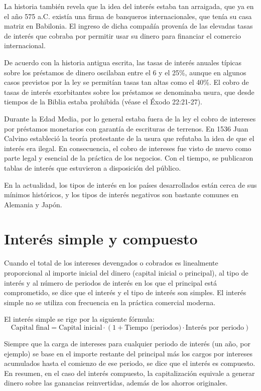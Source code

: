 \documentclass[
]{krantz}
\begin{document}
La historia también revela que la idea del interés estaba tan arraigada, que ya en el año 575 a.C. existía una firma de banqueros internacionales, que tenía su casa matriz en Babilonia. El ingreso de dicha compañía provenía de las elevadas tasas de interés que cobraba por permitir usar su dinero para financiar el comercio internacional.

De acuerdo con la historia antigua escrita, las tasas de interés anuales típicas sobre los préstamos de dinero oscilaban entre el 6 y el 25\%, aunque en algunos casos previstos por la ley se permitían tasas tan altas como el 40\%. El cobro de tasas de interés exorbitantes sobre los préstamos se denominaba usura, que desde tiempos de la Biblia estaba prohibida (véase el Éxodo 22:21-27).

Durante la Edad Media, por lo general estaba fuera de la ley el cobro de intereses por préstamos monetarios con garantía de escrituras de terrenos. En 1536 Juan Calvino estableció la teoría protestante de la usura que refutaba la idea de que el interés era ilegal. En consecuencia, el cobro de intereses fue visto de nuevo como parte legal y esencial de la práctica de los negocios. Con el tiempo, se publicaron tablas de interés que estuvieron a disposición del público.

En la actualidad, los tipos de interés en los países desarrollados están cerca de sus mínimos históricos, y los tipos de interés negativos son bastante comunes en Alemania y Japón.

\hypertarget{interuxe9s-simple-y-compuesto}{%
\section{Interés simple y compuesto}\label{interuxe9s-simple-y-compuesto}}

Cuando el total de los intereses devengados o cobrados es linealmente proporcional al importe inicial del dinero (capital inicial o principal), al tipo de interés y al número de periodos de interés en los que el principal está comprometido, se dice que el interés y el tipo de interés son simples. El interés simple no se utiliza con frecuencia en la práctica comercial moderna.

El interés simple se rige por la siguiente fórmula:
\[\mathrm {\text{Capital final} = \text{Capital inicial}·(1+\text{Tiempo (periodos)}·\text{Interés por periodo})}\]

Siempre que la carga de intereses para cualquier periodo de interés (un año, por ejemplo) se base en el importe restante del principal más los cargos por intereses acumulados hasta el comienzo de ese periodo, se dice que el interés es compuesto. En resumen, en el caso del interés compuesto, la capitalización equivale a generar dinero sobre las ganancias reinvertidas, además de los ahorros originales.
\end{document}
